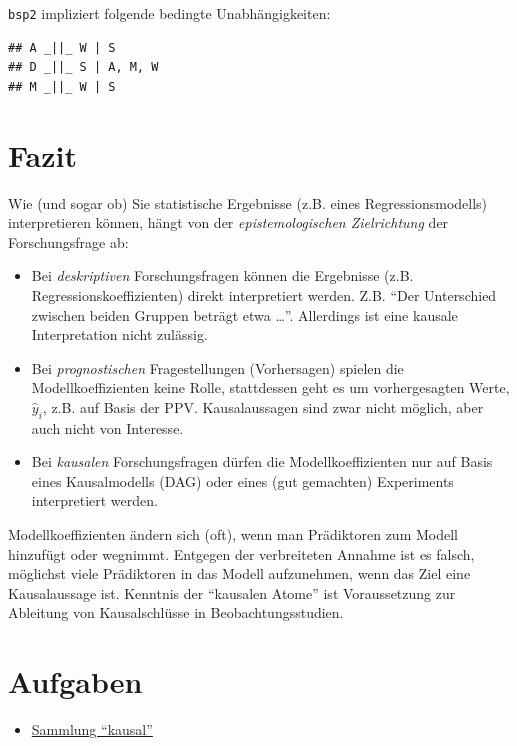 \documentclass[
  a4paper,
  DIV=11]{scrreprt}
\providecommand{\tightlist}{%
  \setlength{\itemsep}{0pt}\setlength{\parskip}{0pt}}\usepackage{longtable,booktabs,array}
\theoremstyle{definition}
\theoremstyle{remark}
\begin{document}
\texttt{bsp2} impliziert folgende bedingte Unabhängigkeiten:

\begin{verbatim}
## A _||_ W | S
## D _||_ S | A, M, W
## M _||_ W | S
\end{verbatim}

\hypertarget{fazit-3}{%
\section{Fazit}\label{fazit-3}}

Wie (und sogar ob) Sie statistische Ergebnisse (z.B. eines
Regressionsmodells) interpretieren können, hängt von der
\emph{epistemologischen Zielrichtung} der Forschungsfrage ab:

\begin{itemize}
\tightlist
\item
  Bei \emph{deskriptiven} Forschungsfragen können die Ergebnisse (z.B.
  Regressionskoeffizienten) direkt interpretiert werden. Z.B. ``Der
  Unterschied zwischen beiden Gruppen beträgt etwa \ldots{}''.
  Allerdings ist eine kausale Interpretation nicht zulässig.
\item
  Bei \emph{prognostischen} Fragestellungen (Vorhersagen) spielen die
  Modellkoeffizienten keine Rolle, stattdessen geht es um vorhergesagten
  Werte, \(\hat{y}_i\), z.B. auf Basis der PPV. Kausalaussagen sind zwar
  nicht möglich, aber auch nicht von Interesse.
\item
  Bei \emph{kausalen} Forschungsfragen dürfen die Modellkoeffizienten
  nur auf Basis eines Kausalmodells (DAG) oder eines (gut gemachten)
  Experiments interpretiert werden.
\end{itemize}

Modellkoeffizienten ändern sich (oft), wenn man Prädiktoren zum Modell
hinzufügt oder wegnimmt. Entgegen der verbreiteten Annahme ist es
falsch, möglichst viele Prädiktoren in das Modell aufzunehmen, wenn das
Ziel eine Kausalaussage ist. Kenntnis der ``kausalen Atome'' ist
Voraussetzung zur Ableitung von Kausalschlüsse in Beobachtungsstudien.

\hypertarget{aufgaben-9}{%
\section{Aufgaben}\label{aufgaben-9}}

\begin{itemize}
\tightlist
\item
  \href{https://datenwerk.netlify.app/\#category=causal}{Sammlung
  ``kausal''}
\end{itemize}
\end{document}
